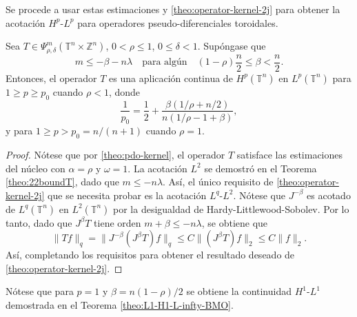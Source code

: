 Se procede a usar estas estimaciones y \cref{theo:operator-kernel-2j} para obtener la acotación $H^p$-$L^p$ para operadores pseudo-diferenciales toroidales. 
\begin{theorem}
	Sea $T\in \Psi^m_{\rho,\delta}(\mathbb{T}^n\times\mathbb{Z}^n)$, $0<\rho\leq1$, $0\leq\delta<1$. Supóngase que 
	\begin{equation*}
		m\leq-\beta-n\lambda \quad  \text{para algún} \quad (1-\rho)\frac{n}{2}\leq\beta< \frac{n}{2}.
	\end{equation*}
	Entonces, el operador $T$ es una aplicación continua de $H^p(\mathbb{T}^n)$ en $L^p(\mathbb{T}^n)$ para $1 \geq p \geq p_0$ cuando $\rho<1$, donde 
	\begin{equation}
		\frac{1}{p_0} = \frac{1}{2} + \frac{\beta(1/\rho + n/2)}{n(1/\rho-1+\beta)},
	\end{equation}
	y para $1\geq p > p_0=n/(n+1)$ cuando $\rho=1$.
	\label{theo:Hp-Lp}
\end{theorem}
\begin{proof}
	Nótese que por \cref{theo:pdo-kernel}, el operador $T$ satisface las estimaciones del núcleo con $\alpha=\rho$ y $\omega=1$. La acotación $L^2$ se demostró en el Teorema \ref{theo:22boundT}, dado que $m\leq -n\lambda$. Así, el único requisito de \cref{theo:operator-kernel-2j} que se necesita probar es la acotación $L^q$-$L^2$. Nótese que $J^{-\beta}$ es acotado de $L^q(\mathbb{T}^n)$ en $L^2(\mathbb{T}^n)$ por la desigualdad de Hardy-Littlewood-Sobolev. Por lo tanto, dado que $J^\beta T$ tiene orden $m+\beta \leq -n\lambda$, se obtiene que 
	\begin{equation}
		\|Tf\|_q =    \|J^{-\beta}(J^\beta T)f\|_q \leq C \|(J^\beta T)f\|_2 \leq C\|f\|_2.
		\label{eq:q-2-boundedness}
	\end{equation}
	Así, completando los requisitos para obtener el resultado deseado de \cref{theo:operator-kernel-2j}.
\end{proof}
\begin{remark}
	Nótese que para $p=1$ y $\beta=n(1-\rho)/2$ se obtiene la continuidad $H^1$-$L^1$ demostrada en el Teorema \ref{theo:L1-H1-L-infty-BMO}.
	\end{remark}
